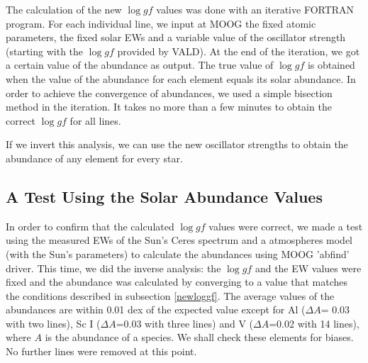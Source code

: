 \documentclass[dvips,12pt,a4paper]{report}
\begin{document}
{%

The calculation of the new $\log gf$ values was done with an iterative FORTRAN program. For each individual line, we input at MOOG the fixed atomic parameters, the fixed solar EWs and a variable value of the oscillator strength (starting with the $\log gf$ provided by VALD). At the end of the iteration, we got a certain value of the abundance as output. The true value of $\log gf$ is obtained when the value of the abundance for each element equals its solar abundance. %
In order to achieve the convergence of abundances, we used a simple bisection method in the iteration. It takes no more than a few minutes to obtain the correct $\log gf$ for all lines. 

If we invert this analysis, we can use the new oscillator strengths to obtain the abundance of any element for every star. %

\subsection {A Test Using the Solar Abundance Values}

In order to confirm that the calculated $\log gf$ values were correct, we made a test using the measured EWs of the Sun's Ceres spectrum and a \citet{Kurucz-1993} atmospheres model (with the Sun's parameters) to calculate the abundances using MOOG 'abfind' driver. This time, we did the inverse analysis: the $\log gf$ and the EW values were fixed and the abundance was calculated by converging to a value that matches the conditions described in subsection \ref{newloggf}. The average values of the abundances are within 0.01 dex of the expected value except for Al ($\Delta A$= 0.03 with two lines), Sc I ($\Delta A$=0.03 with three lines) and V ($\Delta A$=0.02 with 14 lines), where $A$ is the abundance of a species. We shall check these elements for biases. No further lines were removed at this point. %

}
\end{document}
